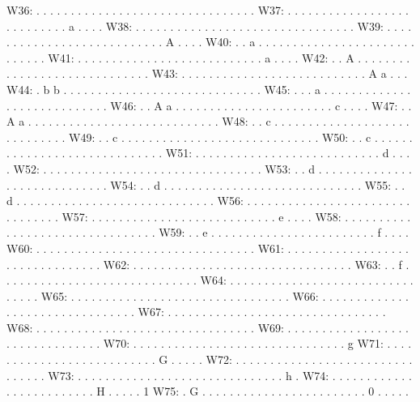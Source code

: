 \begingroup
\fontsize{8pt}{9pt}\selectfont
\begin{verbbox}
W36:	 . . . . . . . . . . . . . . . . . . . . . . . . . . . . . . . .
W37:	 . . . . . . . . . . . . . . . . . . . . . . . . . . . a . . . .
W38:	 . . . . . . . . . . . . . . . . . . . . . . . . . . . . . . . .
W39:	 . . . . . . . . . . . . . . . . . . . . . . . . . . . A . . . .
W40:	 . . a . . . . . . . . . . . . . . . . . . . . . . . . . . . . .
W41:	 . . . . . . . . . . . . . . . . . . . . . . . . . . . a . . . .
W42:	 . . A . . . . . . . . . . . . . . . . . . . . . . . . . . . . .
W43:	 . . . . . . . . . . . . . . . . . . . . . . . . . . . A a . . .
W44:	 . b b . . . . . . . . . . . . . . . . . . . . . . . . . . . . .
W45:	 . . . a . . . . . . . . . . . . . . . . . . . . . . . . . . . .
W46:	 . . A a . . . . . . . . . . . . . . . . . . . . . . . c . . . .
W47:	 . . A a . . . . . . . . . . . . . . . . . . . . . . . . . . . .
W48:	 . . c . . . . . . . . . . . . . . . . . . . . . . . . . . . . .
W49:	 . . c . . . . . . . . . . . . . . . . . . . . . . . . . . . . .
W50:	 . . c . . . . . . . . . . . . . . . . . . . . . . . . . . . . .
W51:	 . . . . . . . . . . . . . . . . . . . . . . . . . . . d . . . .
W52:	 . . . . . . . . . . . . . . . . . . . . . . . . . . . . . . . .
W53:	 . . d . . . . . . . . . . . . . . . . . . . . . . . . . . . . .
W54:	 . . d . . . . . . . . . . . . . . . . . . . . . . . . . . . . .
W55:	 . . d . . . . . . . . . . . . . . . . . . . . . . . . . . . . .
W56:	 . . . . . . . . . . . . . . . . . . . . . . . . . . . . . . . .
W57:	 . . . . . . . . . . . . . . . . . . . . . . . . . . . e . . . .
W58:	 . . . . . . . . . . . . . . . . . . . . . . . . . . . . . . . .
W59:	 . . e . . . . . . . . . . . . . . . . . . . . . . . . f . . . .
W60:	 . . . . . . . . . . . . . . . . . . . . . . . . . . . . . . . .
W61:	 . . . . . . . . . . . . . . . . . . . . . . . . . . . . . . . .
W62:	 . . . . . . . . . . . . . . . . . . . . . . . . . . . . . . . .
W63:	 . . f . . . . . . . . . . . . . . . . . . . . . . . . . . . . .
W64:	 . . . . . . . . . . . . . . . . . . . . . . . . . . . . . . . .
W65:	 . . . . . . . . . . . . . . . . . . . . . . . . . . . . . . . .
W66:	 . . . . . . . . . . . . . . . . . . . . . . . . . . . . . . . .
W67:	 . . . . . . . . . . . . . . . . . . . . . . . . . . . . . . . .
W68:	 . . . . . . . . . . . . . . . . . . . . . . . . . . . . . . . .
W69:	 . . . . . . . . . . . . . . . . . . . . . . . . . . . . . . . .
W70:	 . . . . . . . . . . . . . . . . . . . . . . . . . . . . . . . g
W71:	 . . . . . . . . . . . . . . . . . . . . . . . . . . G . . . . .
W72:	 . . . . . . . . . . . . . . . . . . . . . . . . . . . . . . . .
W73:	 . . . . . . . . . . . . . . . . . . . . . . . . . . . . . . h .
W74:	 . . . . . . . . . . . . . . . . . . . . . . . . . H . . . . . 1
W75:	 . G . . . . . . . . . . . . . . . . . . . . . . . . 0 . . . . .
\end{verbbox}
\endgroup

